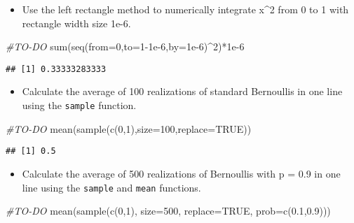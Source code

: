 \documentclass[
]{article}
\newenvironment{Shaded}{\begin{snugshade}}{\end{snugshade}}
\newcommand{\AttributeTok}[1]{\textcolor[rgb]{0.77,0.63,0.00}{#1}}
\newcommand{\CommentTok}[1]{\textcolor[rgb]{0.56,0.35,0.01}{\textit{#1}}}
\newcommand{\ConstantTok}[1]{\textcolor[rgb]{0.00,0.00,0.00}{#1}}
\newcommand{\DecValTok}[1]{\textcolor[rgb]{0.00,0.00,0.81}{#1}}
\newcommand{\FloatTok}[1]{\textcolor[rgb]{0.00,0.00,0.81}{#1}}
\newcommand{\FunctionTok}[1]{\textcolor[rgb]{0.00,0.00,0.00}{#1}}
\newcommand{\NormalTok}[1]{#1}
\newcommand{\SpecialCharTok}[1]{\textcolor[rgb]{0.00,0.00,0.00}{#1}}
\providecommand{\tightlist}{%
  \setlength{\itemsep}{0pt}\setlength{\parskip}{0pt}}
\begin{document}
\begin{itemize}
\tightlist
\item
  Use the left rectangle method to numerically integrate x\^{}2 from 0
  to 1 with rectangle width size 1e-6.
\end{itemize}

\begin{Shaded}
\begin{Highlighting}[]
\CommentTok{\#TO{-}DO}
\FunctionTok{sum}\NormalTok{(}\FunctionTok{seq}\NormalTok{(}\AttributeTok{from=}\DecValTok{0}\NormalTok{,}\AttributeTok{to=}\DecValTok{1}\FloatTok{{-}1e{-}6}\NormalTok{,}\AttributeTok{by=}\FloatTok{1e{-}6}\NormalTok{)}\SpecialCharTok{\^{}}\DecValTok{2}\NormalTok{)}\SpecialCharTok{*}\FloatTok{1e{-}6}
\end{Highlighting}
\end{Shaded}

\begin{verbatim}
## [1] 0.33333283333
\end{verbatim}

\begin{itemize}
\tightlist
\item
  Calculate the average of 100 realizations of standard Bernoullis in
  one line using the \texttt{sample} function.
\end{itemize}

\begin{Shaded}
\begin{Highlighting}[]
\CommentTok{\#TO{-}DO}
\FunctionTok{mean}\NormalTok{(}\FunctionTok{sample}\NormalTok{(}\FunctionTok{c}\NormalTok{(}\DecValTok{0}\NormalTok{,}\DecValTok{1}\NormalTok{),}\AttributeTok{size=}\DecValTok{100}\NormalTok{,}\AttributeTok{replace=}\ConstantTok{TRUE}\NormalTok{))}
\end{Highlighting}
\end{Shaded}

\begin{verbatim}
## [1] 0.5
\end{verbatim}

\begin{itemize}
\tightlist
\item
  Calculate the average of 500 realizations of Bernoullis with p = 0.9
  in one line using the \texttt{sample} and \texttt{mean} functions.
\end{itemize}

\begin{Shaded}
\begin{Highlighting}[]
\CommentTok{\#TO{-}DO}
\FunctionTok{mean}\NormalTok{(}\FunctionTok{sample}\NormalTok{(}\FunctionTok{c}\NormalTok{(}\DecValTok{0}\NormalTok{,}\DecValTok{1}\NormalTok{), }\AttributeTok{size=}\DecValTok{500}\NormalTok{, }\AttributeTok{replace=}\ConstantTok{TRUE}\NormalTok{, }\AttributeTok{prob=}\FunctionTok{c}\NormalTok{(}\FloatTok{0.1}\NormalTok{,}\FloatTok{0.9}\NormalTok{)))}
\end{Highlighting}
\end{Shaded}
\end{document}
